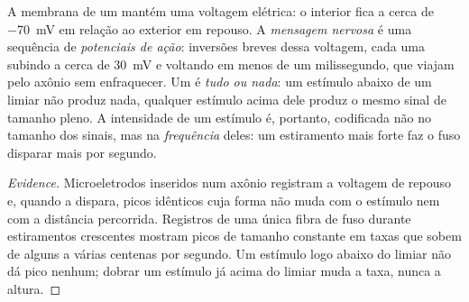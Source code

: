 \begin{proposition}\label{prop:g12:stretch-reflex:actionpotential}
A membrana de um  mantém uma voltagem elétrica: o interior fica
a cerca de \qty{-70}{mV} em relação ao exterior em repouso. A
\emph{mensagem nervosa} é uma sequência de
\emph{potenciais de ação}: inversões breves
dessa voltagem, cada uma subindo a cerca de \qty{+30}{mV} e voltando em
menos de um milissegundo, que viajam pelo axônio sem enfraquecer. Um
 é \emph{tudo ou nada}: um estímulo abaixo de um
limiar não produz nada, qualquer estímulo acima dele produz o mesmo
sinal de tamanho pleno. A intensidade de um estímulo é, portanto,
codificada não no tamanho dos sinais, mas na \emph{frequência} deles:
um estiramento mais forte faz o fuso disparar mais 
por segundo.
\end{proposition}
\begin{proof}[Evidence]
Microeletrodos inseridos num axônio registram a voltagem de repouso e,
quando a  dispara, picos idênticos cuja forma não muda com o
estímulo nem com a distância percorrida. Registros de uma única fibra
de fuso durante estiramentos crescentes mostram picos de tamanho
constante em taxas que sobem de alguns a várias centenas por segundo.
Um estímulo logo abaixo do limiar não dá pico nenhum; dobrar um
estímulo já acima do limiar muda a taxa, nunca a altura.
\end{proof}

